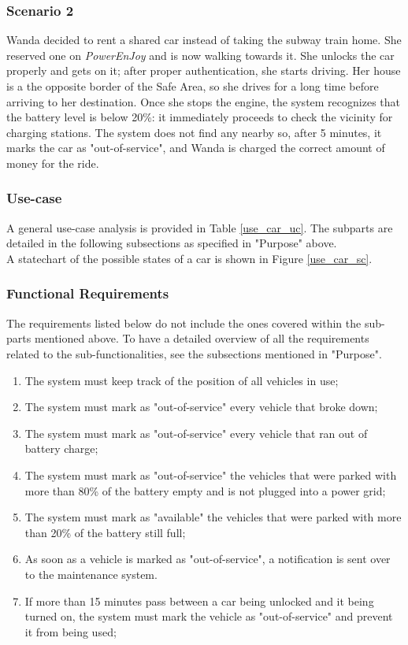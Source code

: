 \subsubsection{Scenario 2}
Wanda decided to rent a shared car instead of taking the subway train home. She reserved one on \emph{PowerEnJoy} and is now walking towards it. She unlocks the car properly and gets on it; after proper authentication, she starts driving. Her house is a the opposite border of the Safe Area, so she drives for a long time before arriving to her destination. Once she stops the engine, the system recognizes that the battery level is below 20\%: it immediately proceeds to check the vicinity for charging stations. The system does not find any nearby so, after 5 minutes, it marks the car as "out-of-service", and Wanda is charged the correct amount of money for the ride.

\subsubsection{Use-case}
A general use-case analysis is provided in Table \ref{use_car_uc}. The subparts are detailed in the following subsections as specified in "Purpose" above. \\
A statechart of the possible states of a car is shown in Figure \ref{use_car_sc}.

\subsubsection{Functional Requirements}
The requirements listed below do not include the ones covered within the sub-parts mentioned above. To have a detailed overview of all the requirements related to the sub-functionalities, see the subsections mentioned in "Purpose".

\begin{enumerate}
\item The system must keep track of the position of all vehicles in use;
\item The system must mark as "out-of-service" every vehicle that broke down;
\item The system must mark as "out-of-service" every vehicle that ran out of battery charge;
\item The system must mark as "out-of-service" the vehicles that were parked with more than 80\% of the battery empty and is not plugged into a power grid;
\item The system must mark as "available" the vehicles that were parked with more than 20\% of the battery still full;
\item As soon as a vehicle is marked as "out-of-service", a notification is sent over to the maintenance system.
\item If more than 15 minutes pass between a car being unlocked and it being turned on, the system must mark the vehicle as "out-of-service" and prevent it from being used;
\end{enumerate}

